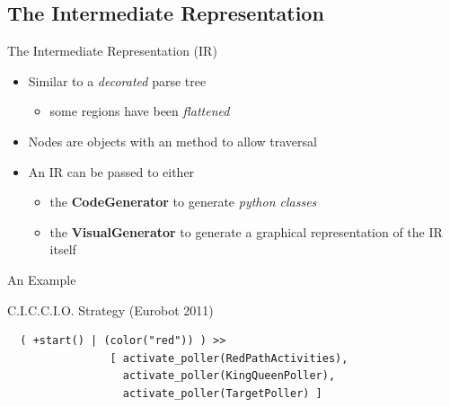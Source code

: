 \subsection{The Intermediate Representation}
\begin{frame}[fragile]{The Intermediate Representation (IR)}
  \begin{itemize}
  \item Similar to a \emph{decorated} parse tree
    \begin{itemize}
    \item some regions have been \emph{flattened}
    \end{itemize}
    \N
  \item Nodes are objects with an  method to allow traversal
    \N
  \item An IR can be passed to either 
    \begin{itemize}
    \item the {\bf CodeGenerator} to generate \emph{python classes}
    \item the {\bf VisualGenerator} to generate a graphical representation of the IR
      itself
    \end{itemize}
  \end{itemize}
\end{frame}
\begin{frame}[fragile]{An Example}
  \begin{exampleblock}{C.I.C.C.I.O. Strategy (Eurobot 2011)}
\begin{verbatim}
  ( +start() | (color("red")) ) >> 
                [ activate_poller(RedPathActivities),
                  activate_poller(KingQueenPoller),
                  activate_poller(TargetPoller) ]
\end{verbatim}
  \end{exampleblock}
  \begin{figure}[!h]
    \begin{center}
    \end{center}
  \end{figure}
\end{frame}



